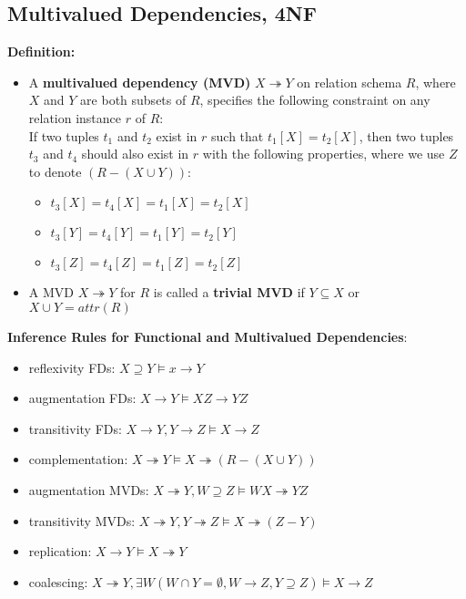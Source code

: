 \subsection{Multivalued Dependencies, 4NF}
\textbf{Definition:}
\begin{itemize}
    \item A \textbf{multivalued dependency (MVD)} $X \twoheadrightarrow Y$ on relation schema $R$, where $X$ and $Y$ are both subsets of $R$, specifies the following constraint on any relation instance $r$ of $R$:\\
    If two tuples $t_1$ and $t_2$ exist in $r$ such that $t_1[X]=t_2[X]$, then two tuples $t_3$ and $t_4$ should also exist in $r$ with the following properties, where we use $Z$ to denote $(R-(X\cup Y))$:
    \begin{itemize}
        \item $t_3[X]=t_4[X]=t_1[X]=t_2[X]$
        \item $t_3[Y]=t_4[Y]=t_1[Y]=t_2[Y]$
        \item $t_3[Z]=t_4[Z]=t_1[Z]=t_2[Z]$
    \end{itemize}
    \item A MVD $X \twoheadrightarrow Y$ for $R$ is called a \textbf{trivial MVD} if $Y \subseteq X$ or $X\cup Y = attr(R)$
\end{itemize}

\textbf{Inference Rules for Functional and Multivalued Dependencies}:
\begin{itemize}
    \item reflexivity FDs: $X\supseteq Y \models x \rightarrow Y$
    \item augmentation FDs: $X\rightarrow Y \models XZ \rightarrow YZ$
    \item transitivity FDs: $X\rightarrow Y, Y \rightarrow Z \models X \rightarrow Z$
    \item complementation: $X \twoheadrightarrow Y \models X \twoheadrightarrow (R-(X\cup Y))$
    \item augmentation MVDs: $X\twoheadrightarrow Y, W \supseteq Z \models WX \twoheadrightarrow YZ$
    \item transitivity MVDs: $X \twoheadrightarrow Y, Y \twoheadrightarrow Z \models X \twoheadrightarrow (Z-Y)$
    \item replication: $X\rightarrow Y \models X \twoheadrightarrow Y$
    \item coalescing: $X \twoheadrightarrow Y, \exists W(W\cap Y = \emptyset, W \rightarrow Z, Y \supseteq Z) \models X \rightarrow Z$ 
\end{itemize}


